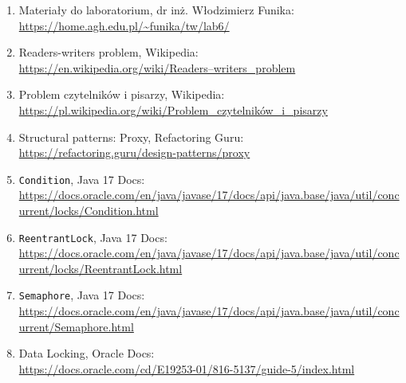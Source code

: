 \documentclass[11pt]{article}
\begin{document}
\begin{enumerate}
\def\labelenumi{\arabic{enumi}.}
\item
  Materiały do laboratorium, dr inż. Włodzimierz Funika:\\
  \url{https://home.agh.edu.pl/~funika/tw/lab6/}
\item
  Readers-writers problem, Wikipedia:\\
  \url{https://en.wikipedia.org/wiki/Readers–writers_problem}
\item
  Problem czytelników i pisarzy, Wikipedia:\\
  \url{https://pl.wikipedia.org/wiki/Problem_czytelników_i_pisarzy}
\item
  Structural patterns: Proxy, Refactoring Guru:\\
  \url{https://refactoring.guru/design-patterns/proxy}
\item
  \texttt{Condition}, Java 17 Docs:\\
  \url{https://docs.oracle.com/en/java/javase/17/docs/api/java.base/java/util/concurrent/locks/Condition.html}
\item
  \texttt{ReentrantLock}, Java 17 Docs:\\
  \url{https://docs.oracle.com/en/java/javase/17/docs/api/java.base/java/util/concurrent/locks/ReentrantLock.html}
\item
  \texttt{Semaphore}, Java 17 Docs:\\
  \url{https://docs.oracle.com/en/java/javase/17/docs/api/java.base/java/util/concurrent/Semaphore.html}
\item
  Data Locking, Oracle Docs:\\
  \url{https://docs.oracle.com/cd/E19253-01/816-5137/guide-5/index.html}
\end{enumerate}


    
    
    
\end{document}
